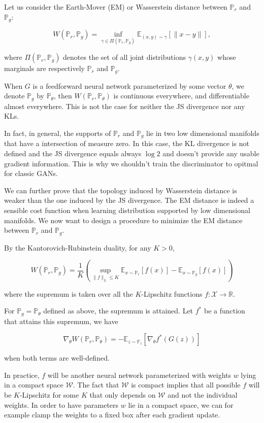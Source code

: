 Let us consider the Earth-Mover (EM) or Wasserstein distance between
$\mathbb{P}_r$ and $\mathbb{P}_g$:

\[
  W(\mathbb{P}_r, \mathbb{P}_g)
  = \inf_{\gamma\in\Pi(\mathbb{P}_r, \mathbb{P}_g)}
  \mathbb{E}_{(x,y)\sim\gamma}[\|x-y\|],
\]

where $\Pi(\mathbb{P}_r, \mathbb{P}_g)$ denotes the set of all joint
distributions $\gamma(x, y)$ whose marginals are respectively $\mathbb{P}_r$
and $\mathbb{P}_g$.

When $G$ is a feedforward neural network parameterized by some vector $\theta$,
we denote $\mathbb{P}_g$ by $\mathbb{P}_{\theta}$, then
$W(\mathbb{P}_r, \mathbb{P}_{\theta})$ is continuous everywhere, and
differentiable almost everywhere. This is not the case for neither the JS
divergence nor any KLs.

In fact, in general, the supports of $\mathbb{P}_r$ and $\mathbb{P}_g$ lie
in two low dimensional manifolds that have a intersection of measure zero.
In this case, the KL divergence is not defined and the JS
divergence equals always $\log2$ and doesn't provide any usable gradient
information. This is why we shouldn't train the discriminator to opitmal
for classic GANs.

We can further prove that the topology induced by Wasserstein distance is
weaker than the one induced by the JS divergence. The EM distance is indeed a
sensible cost function when learning distribution supported by low
dimensional manifolds. We now want to design a procedure to minimize the EM
distance between $\mathbb{P}_r$ and $\mathbb{P}_g$.

By the Kantorovich-Rubinstein duality, for any $K > 0$,

\[
  W(\mathbb{P}_r, \mathbb{P}_g)
  = \frac{1}{K} \left( \sup_{\|f\|_L \le K}
  \mathbb{E}_{x\sim\mathbb{P}_r}[f(x)] - \mathbb{E}_{x\sim\mathbb{P}_g}[f(x)]
  \right)
\]

where the supremum is taken over all the $K$-Lipschitz functions
$f: \mathcal{X} \rightarrow \mathbb{R}$.

For $\mathbb{P}_g = \mathbb{P}_{\theta}$ defined as above, the supremum is
attained. Let $f^*$ be a function that attains this supremum, we have

\[
  \nabla_{\theta}W(\mathbb{P}_r, \mathbb{P}_{\theta})
  = -\mathbb{E}_{z\sim\mathbb{P}_z}[\nabla_{\theta}f^*(G(z))]
\]

when both terms are well-defined.

In practice, $f$ will be another neural network parameterized with weights $w$
lying in a compact space $\mathcal{W}$. The fact that $\mathcal{W}$ is compact
implies that all possible $f$ will be $K$-Lipschitz for some $K$ that only
depends on $\mathcal{W}$ and not the individual weights. In order to have
parameters $w$ lie in a compact space, we can for example clamp the weights to
a fixed box after each gradient update.

